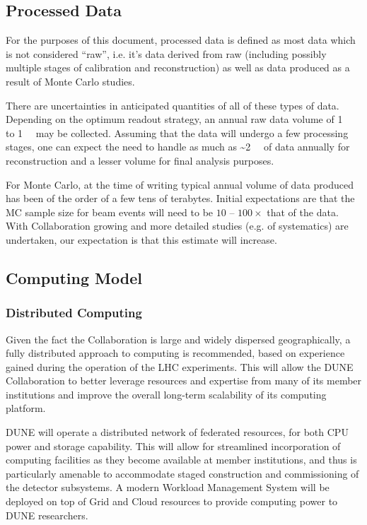 \subsection{Processed Data}
\label{sec:detectors-sc-infrastructure-processed-data}
For the purposes of this document, processed data is defined as most data which is not considered ``raw'', i.e. it's data derived from raw (including possibly multiple stages
of calibration and reconstruction) as well as data produced as a result of Monte Carlo studies.

There are uncertainties in anticipated quantities of all of these types of data.
Depending on the optimum readout strategy, an annual raw data volume of
\SI{1}{\tera\byte} to \SI{1}{\peta\byte} may be collected.
Assuming that
the data will undergo a few processing stages, one can expect the need
to handle as much as \textasciitilde \SI{2}{\peta\byte} of data annually for reconstruction and a lesser
volume for final analysis purposes.

For Monte Carlo, at the time of writing typical annual volume of data produced has been of the order of a few tens of terabytes.
Initial expectations are that the MC sample size for beam events will
need to be $10$ -- $100\times$ that of the data.
With Collaboration growing
and more detailed studies (e.g. of systematics) are undertaken, our
expectation is that this estimate will increase.

\subsection{Computing Model}
\label{sec:detectors-sc-infrastructure-computing-model}

\subsubsection{Distributed Computing}

Given the fact the Collaboration is large and widely dispersed geographically, a fully distributed approach to computing is recommended, based on experience
gained during the operation of the LHC experiments. This will allow the DUNE Collaboration to better leverage resources and expertise from many of its
member institutions and improve the overall long-term scalability of its computing platform.

DUNE will operate a  distributed network of federated resources, for both CPU power and storage capability. This will allow for streamlined incorporation
of computing facilities as they become available at member institutions, and thus is particularly amenable to accommodate staged construction and commissioning
of the detector subsystems. A modern Workload Management System will be deployed on top of Grid and Cloud resources to provide computing
power to DUNE researchers.

